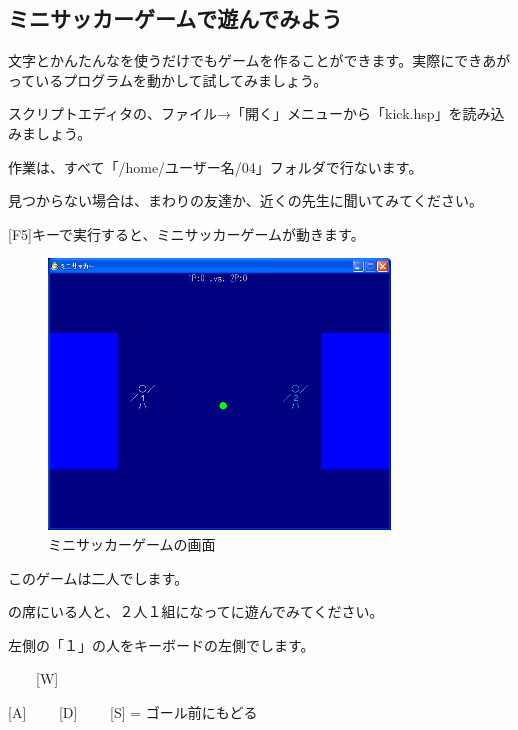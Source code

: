 \newpage
\subsection{ミニサッカーゲームで遊んでみよう}



文字とかんたんなを使うだけでもゲームを作ることができます。実際にできあがっているプログラムを動かして試してみましょう。

スクリプトエディタの、ファイル→「開く」メニューから「kick.hsp」を読み込みましょう。

作業は、すべて「/home/ユーザー名/04」フォルダで行ないます。

見つからない場合は、まわりの友達か、近くの先生に聞いてみてください。



[F5]キーで実行すると、ミニサッカーゲームが動きます。



\begin{figure}[H]
    \begin{center}
      \includegraphics[keepaspectratio,width=9.075cm,height=7.197cm]{text04-img/text04-img005.png}
      \caption{ミニサッカーゲームの画面}
    \end{center}
    \label{fig:prog_menu}
\end{figure}


このゲームは二人でします。

の席にいる人と、２人１組になってに遊んでみてください。

左側の「１」の人をキーボードの左側でします。




\ \ \ \ [W]

[A] \ \ \ \ [D] \ \ \ \ [S] = ゴール前にもどる


